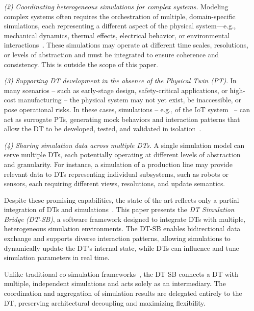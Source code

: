 \textit{(2) Coordinating heterogeneous simulations for complex systems.}  
Modeling complex systems often requires the orchestration of multiple, domain-specific simulations, each representing a different aspect of the physical system---e.g., mechanical dynamics, thermal effects, electrical behavior, or environmental interactions~\cite{10.1115/1.4049861,Fitzgerald2019}.
These simulations may operate at different time scales, resolutions, or levels of abstraction and must be integrated to ensure coherence and consistency. This is outside the scope of this paper.


\textit{(3) Supporting DT development in the absence of the Physical Twin (PT).}  
In many scenarios -- such as early-stage design, safety-critical applications, or high-cost manufacturing -- the physical system may not yet exist, be inaccessible, or pose operational risks.
In these cases, simulations -- e.g., of the IoT system~\cite{7568309} -- can act as surrogate PTs, generating mock behaviors and interaction patterns that allow the DT to be developed, tested, and validated in isolation~\cite{AITALLA20191331, 11087838}.

\textit{(4) Sharing simulation data across multiple DTs.}  
A single simulation model can serve multiple DTs, each potentially operating at different levels of abstraction and granularity.
For instance, a simulation of a production line may provide relevant data to DTs representing individual subsystems, such as robots or sensors, each requiring different views, resolutions, and update semantics. 

Despite these promising capabilities, the state of the art reflects only a partial integration of DTs and simulations~\cite{WOOLEY2023940}.
This paper presents the \emph{DT Simulation Bridge (DT-SB)}, a software framework designed to integrate DTs with multiple, heterogeneous simulation environments. The DT-SB enables bidirectional data exchange and supports diverse interaction patterns, allowing simulations to dynamically update the DT's internal state, while DTs can influence and tune simulation parameters in real time.

Unlike traditional co-simulation frameworks~\cite{Gomes&18}, the DT-SB connects a DT with multiple, independent simulations and acts solely as an intermediary. The coordination and aggregation of simulation results are delegated entirely to the DT, preserving architectural decoupling and maximizing flexibility.

